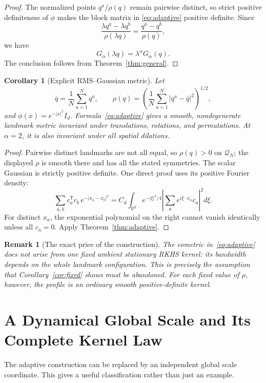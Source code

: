 \documentclass[11pt]{article}
\newtheorem{corollary}{Corollary}
\newtheorem{remark}{Remark}
\newcommand{\R}{\mathbb{R}}
\newcommand{\Q}{\mathcal{Q}}
\begin{document}
\begin{proof}
The normalized points \(q^a/\rho(q)\) remain pairwise distinct, so strict
positive definiteness of \(\phi\) makes the block matrix in
\eqref{eq:adaptive} positive definite.  Since
\[
 \frac{\lambda q^a-\lambda q^b}{\rho(\lambda q)}
 =\frac{q^a-q^b}{\rho(q)},
\]
we have
\[
 G_\alpha(\lambda q)=\lambda^\alpha G_\alpha(q).
\]
The conclusion follows from Theorem~\ref{thm:general}.
\end{proof}

\begin{corollary}[Explicit RMS--Gaussian metric]
\label{cor:gaussian}
Let
\[
 \bar q=\frac1N\sum_{a=1}^{N}q^a,\qquad
 \rho(q)=
 \left(\frac1N\sum_{a=1}^{N}|q^a-\bar q|^2\right)^{1/2},
\]
and \(\phi(x)=e^{-|x|^2}I_d\).  Formula~\eqref{eq:adaptive} gives a
smooth, nondegenerate landmark metric invariant under translations,
rotations, and permutations.  At \(\alpha=2\), it is also invariant under
all spatial dilations.
\end{corollary}

\begin{proof}
Pairwise distinct landmarks are not all equal, so \(\rho(q)>0\) on
\(\Q_N\); the displayed \(\rho\) is smooth there and has all the stated
symmetries.  The scalar Gaussian is strictly positive definite.  One direct
proof uses its positive Fourier density:
\[
 \sum_{a,b}c_a^{\mathsf T}c_b\,e^{-|x_a-x_b|^2}
 =C_d\int_{\R^d}e^{-|\xi|^2/4}
 \left|\sum_a e^{i\xi\cdot x_a}c_a\right|^2d\xi.
\]
For distinct \(x_a\), the exponential polynomial on the right cannot vanish
identically unless all \(c_a=0\).  Apply Theorem~\ref{thm:adaptive}.
\end{proof}

\begin{remark}[The exact price of the construction]
The cometric in~\eqref{eq:adaptive} does not arise from one fixed ambient
stationary RKHS kernel: its bandwidth depends on the whole landmark
configuration.  This is precisely the assumption that Corollary~\ref{cor:fixed}
shows must be abandoned.  For each fixed value of \(\rho\), however, the
profile is an ordinary smooth positive-definite kernel.
\end{remark}

\section*{A Dynamical Global Scale and Its Complete Kernel Law}

The adaptive construction can be replaced by an independent global scale
coordinate.  This gives a useful classification rather than just an example.
\end{document}
